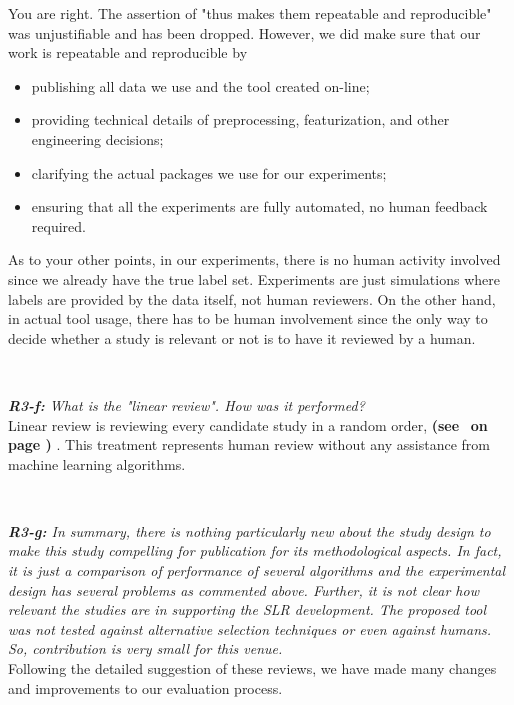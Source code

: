 \documentclass{svjour3}
\theoremstyle{break}
\newcommand{\review}[1]{{\textit{#1}}~\\}
\newcommand{\citeresp}[1]{
{\bf (see } \fcolorbox{black}{black!15}{
 \bf
  \scriptsize R-{#1}}~{\bf{on page \pageref{response:#1})}}
}
\begin{document}
You are right. The assertion of "thus makes them repeatable and reproducible" was unjustifiable and has been dropped. However, we did make sure that our work is repeatable and reproducible by
\begin{itemize}
\item
publishing all data we use and the tool created on-line;
\item
providing technical details of preprocessing, featurization, and other engineering decisions;
\item
clarifying the actual packages we use for our experiments;
\item
ensuring that all the experiments are fully automated, no human feedback required.
\end{itemize}

As to your other points, in our experiments, there is no human activity involved since we already have the true label set. Experiments are just simulations where labels are provided by the data itself, not human reviewers. On the other hand, in actual tool usage, there has to be human involvement since the only way to decide whether a study is relevant or not is to have it reviewed by a human.



\par ~




\review{\textbf{R3-f:} What is the "linear review". How was it performed?}

Linear review is reviewing every candidate study in a random order, \citeresp{3f}. This treatment represents human review without any assistance from machine learning algorithms.

\par ~
 
\review{\textbf{R3-g:} In summary, there is nothing particularly new about the study design to make this study compelling for publication for its methodological aspects. In fact, it is just a comparison of performance of several algorithms and the experimental design has several problems as commented above. Further, it is not clear how relevant the studies are in supporting the SLR development. The proposed tool was not tested against alternative selection techniques or even against humans. So, contribution is very small for this venue.}

Following the detailed suggestion of these reviews, we have made many changes and improvements to our evaluation process. 
\end{document}
